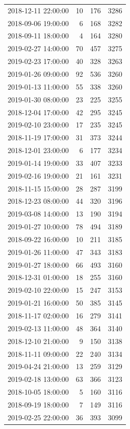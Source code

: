 \begin{tabular}{lrrr}
2018-12-11 22:00:00 & 10 & 176 & 3286 \\
2018-09-06 19:00:00 & 6 & 168 & 3282 \\
2018-09-11 18:00:00 & 4 & 164 & 3280 \\
2019-02-27 14:00:00 & 70 & 457 & 3275 \\
2019-02-23 17:00:00 & 40 & 328 & 3263 \\
2019-01-26 09:00:00 & 92 & 536 & 3260 \\
2019-01-13 11:00:00 & 55 & 338 & 3260 \\
2019-01-30 08:00:00 & 23 & 225 & 3255 \\
2018-12-04 17:00:00 & 42 & 295 & 3245 \\
2019-02-10 23:00:00 & 17 & 235 & 3245 \\
2018-11-19 17:00:00 & 31 & 373 & 3244 \\
2018-12-01 23:00:00 & 6 & 177 & 3234 \\
2019-01-14 19:00:00 & 33 & 407 & 3233 \\
2019-02-16 19:00:00 & 21 & 161 & 3231 \\
2018-11-15 15:00:00 & 28 & 287 & 3199 \\
2018-12-23 08:00:00 & 44 & 320 & 3196 \\
2019-03-08 14:00:00 & 13 & 190 & 3194 \\
2019-01-27 10:00:00 & 78 & 494 & 3189 \\
2018-09-22 16:00:00 & 10 & 211 & 3185 \\
2019-01-26 11:00:00 & 47 & 343 & 3183 \\
2019-01-27 18:00:00 & 66 & 493 & 3160 \\
2018-12-31 01:00:00 & 18 & 255 & 3160 \\
2019-02-10 22:00:00 & 15 & 247 & 3153 \\
2019-01-21 16:00:00 & 50 & 385 & 3145 \\
2018-11-17 02:00:00 & 16 & 279 & 3141 \\
2019-02-13 11:00:00 & 48 & 364 & 3140 \\
2018-12-10 21:00:00 & 9 & 150 & 3138 \\
2018-11-11 09:00:00 & 22 & 240 & 3134 \\
2019-04-24 21:00:00 & 13 & 259 & 3129 \\
2019-02-18 13:00:00 & 63 & 366 & 3123 \\
2018-10-05 18:00:00 & 5 & 160 & 3116 \\
2018-09-19 18:00:00 & 7 & 149 & 3116 \\
2019-02-25 22:00:00 & 36 & 393 & 3099 \\

\end{tabular}

